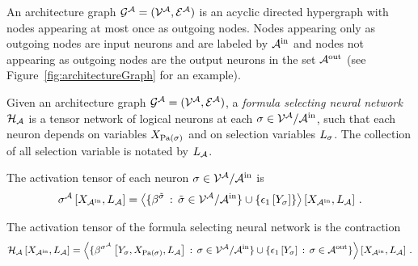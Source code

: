 \begin{definition}\label{def:fsNeuralNetwork}

	
	An architecture graph $\mathcal{G}^{\mathcal{A}}=(\mathcal{V}^{\mathcal{A}},\mathcal{E}^{\mathcal{A}})$ is an acyclic directed hypergraph with nodes appearing at most once as outgoing nodes.
	Nodes appearing only as outgoing nodes are input neurons and are labeled by $\mathcal{A}^{\mathrm{in}}$ and nodes not appearing as outgoing nodes are the output neurons in the set $\mathcal{A}^{\mathrm{out}}$ (see Figure~\ref{fig:architectureGraph} for an example).

	Given an architecture graph $\mathcal{G}^{\mathcal{A}}=(\mathcal{V}^{\mathcal{A}},\mathcal{E}^{\mathcal{A}})$, a \emph{formula selecting neural network} $\mathcal{H}_{\mathcal{A}}$ is a tensor network of logical neurons at each $\sigma\in\mathcal{V}^{\mathcal{A}}/\mathcal{A}^{\mathrm{in}}$, such that each neuron depends on variables $X_{\mathrm{Pa}(\sigma)}$ and on selection variables $L_{\sigma}$.
	The collection of all selection variable is notated by $L_{\mathcal{A}}$.

	The activation tensor of each neuron $\sigma\in\mathcal{V}^{\mathcal{A}}/\mathcal{A}^{\mathrm{in}}$ is
	\begin{align*}
		\sigma^{\mathcal{A}}\left[X_{\mathcal{A}^{\mathrm{in}}},L_{\mathcal{A}}\right] 
		= \left\langle 
			\{\beta^{\tilde{\sigma}} \, : \, \tilde{\sigma}\in\mathcal{V}^{\mathcal{A}}/\mathcal{A}^{\mathrm{in}} \} \cup \{\epsilon_{1}\left[Y_{\sigma}\right]\}
		\right\rangle \left[ X_{\mathcal{A}^{\mathrm{in}}},L_{\mathcal{A}} \right] \, . 
	\end{align*}
		
	The activation tensor of the formula selecting neural network is the contraction
	\begin{align*}
		\mathcal{H}_{\mathcal{A}}\left[X_{\mathcal{A}^{\mathrm{in}}},L_{\mathcal{A}}\right] 
		= \left\langle 
			\{\beta^{\sigma^{\mathcal{A}}}\left[Y_{\sigma},X_{\mathrm{Pa}(\sigma)},L_{\mathcal{A}}\right] \, : \, \sigma\in\mathcal{V}^{\mathcal{A}}/\mathcal{A}^{\mathrm{in}} \} \cup \{\epsilon_{1}\left[Y_{\sigma}\right] \, : \, \sigma\in\mathcal{A}^{\mathrm{out}}\}
		\right\rangle \left[ X_{\mathcal{A}^{\mathrm{in}}},L_{\mathcal{A}} \right] \, . 
	\end{align*}
	

\end{definition}
